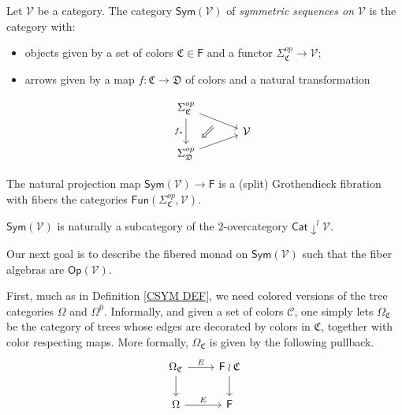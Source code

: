 \documentclass[a4paper,10pt
,draft
]{article}%
\renewcommand{\1}{\eta}%
\newcommand{\OC}{\Omega_{\mathfrak C}}
\begin{document}
\begin{definition}
Let $\mathcal{V}$ be a category.
The category $\mathsf{Sym}(\mathcal{V})$ of
\textit{symmetric sequences on $\mathcal{V}$} is the category with:
\begin{itemize}
\item objects given by a set of colors $\mathfrak{C} \in \mathsf{F}$
and a functor $\Sigma_{\mathfrak{C}}^{op} \to \mathcal{V}$;
\item arrows given by a map 
$f \colon \mathfrak{C} \to \mathfrak{D}$ of colors and a natural transformation

		\begin{equation}
		\begin{tikzcd}[row sep = tiny, column sep = 35pt]
			\Sigma_{\mathfrak{C}}^{op} \arrow{dr}[name=U]{} \arrow{dd}[swap]{f_{\**}}
		\\
			& \mathcal{V}
		\\
			|[alias=V]| \Sigma_{\mathfrak{D}}^{op} \arrow{ur}[swap]{}
		\arrow[Leftarrow, from=V, to=U,shorten >=0.25cm,shorten <=0.25cm
		,swap
		]
		\end{tikzcd}
		\end{equation}
\end{itemize}
\end{definition}


\begin{remark} The natural projection map
$\mathsf{Sym}(\mathcal{V}) \to \mathsf{F}$
is a (split) Grothendieck fibration with fibers the categories
$\mathsf{Fun}(\Sigma_{\mathfrak{C}}^{op},\mathcal{V})$.
\end{remark}


\begin{remark}
$\mathsf{Sym}(\mathcal{V})$ is naturally a subcategory of the $2$-overcategory
$\mathsf{Cat}\downarrow^l \mathcal{V}$.
\end{remark}



Our next goal is to describe the fibered monad on $\mathsf{Sym}(\mathcal{V})$ such that the fiber algebras are
$\mathsf{Op}(\mathcal{V})$.

First, much as in Definition \ref{CSYM DEF}, we need colored versions of the tree categories $\Omega$ and $\Omega^0$.
Informally, and given a set of colors $\mathcal{C}$, 
one simply lets $\Omega_{\mathfrak{C}}$
be the category of trees whose edges are decorated by colors in $\mathfrak{C}$, together with color respecting maps. More formally, $\Omega_{\mathfrak{C}}$ is given by the following pullback.
\begin{equation}
	\begin{tikzcd}
		\OC \arrow[d] \arrow[r, "E"] &
		\mathsf F \wr \mathfrak C \arrow[d]
\\
		\Omega \arrow[r, "E"] &
		\mathsf F
	\end{tikzcd}
\end{equation}
\end{document}
